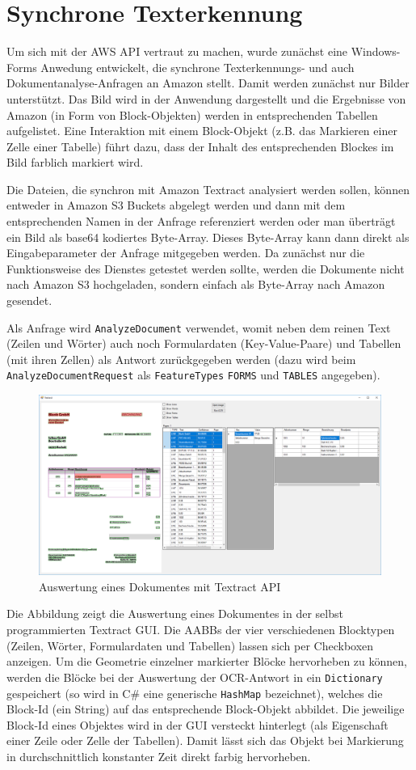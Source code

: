 \documentclass{whswinvcbook}
\begin{document}
\section{Synchrone Texterkennung}
Um sich mit der AWS API vertraut zu machen, wurde zunächst eine Windows-Forms Anwedung entwickelt, die synchrone Texterkennungs- und auch Dokumentanalyse-Anfragen an Amazon stellt. Damit werden zunächst nur Bilder unterstützt. Das Bild wird in der Anwendung dargestellt und die Ergebnisse von Amazon (in Form von Block-Objekten) werden in entsprechenden Tabellen aufgelistet. Eine Interaktion mit einem Block-Objekt (z.B. das Markieren einer Zelle einer Tabelle) führt dazu, dass der Inhalt des entsprechenden Blockes im Bild farblich markiert wird.

Die Dateien, die synchron mit Amazon Textract analysiert werden sollen, können entweder in Amazon S3 Buckets abgelegt werden und dann mit dem entsprechenden Namen in der Anfrage referenziert werden oder man überträgt ein Bild als base64 kodiertes Byte-Array. Dieses Byte-Array kann dann direkt als Eingabeparameter der Anfrage mitgegeben werden. Da zunächst nur die Funktionsweise des Dienstes getestet werden sollte, werden die Dokumente nicht nach Amazon S3 hochgeladen, sondern einfach als Byte-Array nach Amazon gesendet.

Als Anfrage wird \texttt{AnalyzeDocument} verwendet, womit neben dem reinen Text (Zeilen und Wörter) auch noch Formulardaten (Key-Value-Paare) und Tabellen (mit ihren Zellen) als Antwort zurückgegeben werden (dazu wird beim \texttt{AnalyzeDocumentRequest} als \texttt{FeatureTypes} \texttt{FORMS} und \texttt{TABLES} angegeben).
\begin{figure}[H]
    \centering
    \includegraphics[width=1.0\textwidth]{img/textract_gui.png}
    \caption{Auswertung eines Dokumentes mit Textract API}
    \label{fig-textract-gui}
\end{figure}
Die Abbildung zeigt die Auswertung eines Dokumentes in der selbst programmierten Textract GUI. Die AABBs der vier verschiedenen Blocktypen (Zeilen, Wörter, Formulardaten und Tabellen) lassen sich per Checkboxen anzeigen. Um die Geometrie einzelner markierter Blöcke hervorheben zu können, werden die Blöcke bei der Auswertung der OCR-Antwort in ein \texttt{Dictionary} gespeichert (so wird in C\# eine generische \texttt{HashMap} bezeichnet), welches die Block-Id (ein String) auf das entsprechende Block-Objekt abbildet. Die jeweilige Block-Id eines Objektes wird in der GUI versteckt hinterlegt (als Eigenschaft einer Zeile oder Zelle der Tabellen). Damit lässt sich das Objekt bei Markierung in durchschnittlich konstanter Zeit direkt farbig hervorheben.
\end{document}
